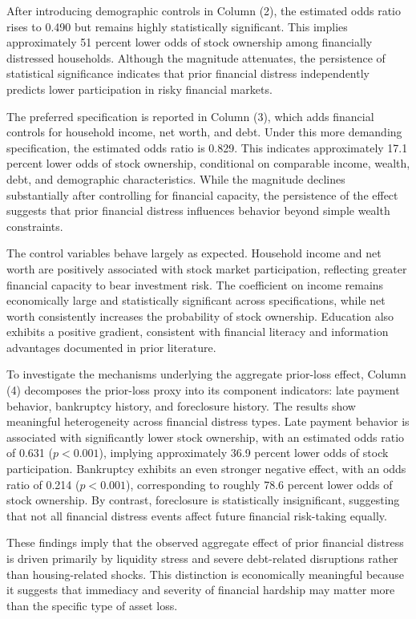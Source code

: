 \documentclass[12pt]{article}
\begin{document}
\medskip
After introducing demographic controls in Column (2), the estimated odds ratio rises to 0.490 but remains highly statistically significant. This implies approximately 51 percent lower odds of stock ownership among financially distressed households. Although the magnitude attenuates, the persistence of statistical significance indicates that prior financial distress independently predicts lower participation in risky financial markets.

\medskip
The preferred specification is reported in Column (3), which adds financial controls for household income, net worth, and debt. Under this more demanding specification, the estimated odds ratio is 0.829. This indicates approximately 17.1 percent lower odds of stock ownership, conditional on comparable income, wealth, debt, and demographic characteristics. While the magnitude declines substantially after controlling for financial capacity, the persistence of the effect suggests that prior financial distress influences behavior beyond simple wealth constraints.

\medskip
The control variables behave largely as expected. Household income and net worth are positively associated with stock market participation, reflecting greater financial capacity to bear investment risk. The coefficient on income remains economically large and statistically significant across specifications, while net worth consistently increases the probability of stock ownership. Education also exhibits a positive gradient, consistent with financial literacy and information advantages documented in prior literature.

\medskip
To investigate the mechanisms underlying the aggregate prior-loss effect, Column (4) decomposes the prior-loss proxy into its component indicators: late payment behavior, bankruptcy history, and foreclosure history. The results show meaningful heterogeneity across financial distress types. Late payment behavior is associated with significantly lower stock ownership, with an estimated odds ratio of 0.631 ($p < 0.001$), implying approximately 36.9 percent lower odds of stock participation. Bankruptcy exhibits an even stronger negative effect, with an odds ratio of 0.214 ($p < 0.001$), corresponding to roughly 78.6 percent lower odds of stock ownership. By contrast, foreclosure is statistically insignificant, suggesting that not all financial distress events affect future financial risk-taking equally.

\medskip
These findings imply that the observed aggregate effect of prior financial distress is driven primarily by liquidity stress and severe debt-related disruptions rather than housing-related shocks. This distinction is economically meaningful because it suggests that immediacy and severity of financial hardship may matter more than the specific type of asset loss.
\end{document}
